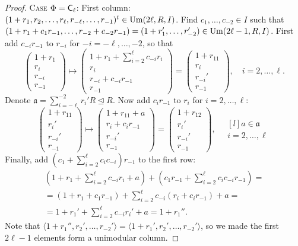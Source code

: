 \begin{proof}
\textsc{Case $\Phi=\mathsf{C}_\ell$:}
First column: $(1+r_1,r_2,\ldots,r_\ell,r_{-\ell},\ldots,r_{-1})^t\in\operatorname{Um}(2\ell,R,I)$. Find $c_1,\ldots,c_{-2}\in I$ such that $(1+r_1+c_1r_{-1},\ldots,r_{-2}+c_{-2}r_{-1})=(1+r_1',\ldots,r_{-2}')\in\operatorname{Um}(2\ell-1,R,I)$. First add $c_{-i}r_{-1}$ to $r_{-i}$ for $-i=-\ell,\ldots,-2$, so that
\[
\begin{pmatrix}
1+r_1 \\ r_i \\ r_{-i} \\ r_{-1}
\end{pmatrix}
\longmapsto
\begin{pmatrix}
1+r_1+\sum_{i=2}^\ell c_{-i}r_i\\ r_i \\ r_{-i}+c_{-i}r_{-1} \\ r_{-1}
\end{pmatrix}=
\begin{pmatrix}
1+r_{11} \\ r_i \\ r_{-i}' \\ r_{-1}
\end{pmatrix},\quad i=2,\ldots,\ell.
\]
Denote $\mathfrak{a}=\sum_{i=-\ell}^{-2} r_i'R\unlhd R$. Now add $c_ir_{-1}$ to $r_i$ for $i=2,\ldots,\ell$:
\[
\begin{pmatrix}
1+r_{11} \\ r_i' \\ r_{-i}' \\ r_{-1}
\end{pmatrix}
\longmapsto
\begin{pmatrix}
1+r_{11}+a \\ r_i+c_ir_{-1} \\ r_{-i}' \\ r_{-1}
\end{pmatrix}=
\begin{pmatrix}
1+r_{12} \\ r_i' \\ r_{-i}' \\ r_{-1}
\end{pmatrix},\quad
\begin{matrix*}[l]
a\in\mathfrak{a}\\
i=2,\ldots,\ell
\end{matrix*}
\]
Finally, add $\left(c_1+\sum_{i=2}^\ell c_ic_{-i}\right)r_{-1}$ to the first row:
\begin{multline*}
\left(1+r_1+\sum\nolimits_{i=2}^\ell c_{-i}r_i+a\right)+\left(c_1r_{-1}+\sum\nolimits_{i=2}^\ell c_ic_{-i}r_{-1}\right)=\\
=(1+r_1+c_1r_{-1})+\sum\nolimits_{i=2}^\ell c_{-i}(r_i+c_ir_{-1})+a=\\
=1+r_1'+\sum\nolimits_{i=2}^\ell c_{-i}r_i'+a=1+r_1''.
\end{multline*}
Note that $\langle 1+r_1'',r_2',\ldots,r_{-2}'\rangle=\langle 1+r_1',r_2',\ldots,r_{-2}'\rangle$, so we made the first $2\ell-1$ elements form a unimodular column.


\end{proof}
